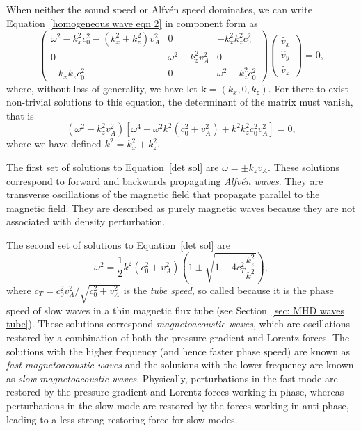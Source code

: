 \documentclass[12pt]{../style-files/ociamthesis}
\begin{document}
When neither the sound speed or Alfv\'{e}n speed dominates, we can write Equation~\eqref{homogeneous wave eqn 2} in component form as
\begin{equation}
	\left(\begin{matrix}
		\omega^2 - k_x^2c_0^2 - (k_x^2 + k_z^2)v_A^2 & 0 & -k_x^2k_z^2c_0^2 \\
		0 & \omega^2 - k_z^2v_A^2 & 0 \\
		-k_xk_zc_0^2 & 0 & \omega^2 - k_z^2c_0^2
	\end{matrix}\right)
	\left(\begin{matrix}
		\hat{v}_x \\
		\hat{v}_y \\
		\hat{v}_z
	\end{matrix} \right) = 0,
\end{equation}
where, without loss of generality, we have let $\mathbf{k} = (k_x, 0, k_z)$. For there to exist non-trivial solutions to this equation, the determinant of the matrix must vanish, that is
\begin{equation}
	(\omega^2 - k_z^2v_A^2)\left[\omega^4 - \omega^2k^2(c_0^2 + v_A^2) + k^2k_z^2c_0^2v_A^2 \right] = 0, \label{det sol}
\end{equation}
where we have defined $k^2 = k_x^2 + k_z^2$.

The first set of solutions to Equation~\eqref{det sol} are $\omega = \pm k_zv_A$. These solutions correspond to forward and backwards propagating \textit{Alfv\'{e}n waves}. They are transverse oscillations of the magnetic field that propagate parallel to the magnetic field. They are described as purely magnetic waves because they are not associated with density perturbation.

The second set of solutions to Equation~\eqref{det sol} are
\begin{equation}
	\omega^2 = \frac{1}{2}k^2(c_0^2 + v_A^2)\left(1 \pm \sqrt{1 - 4c_T^2\frac{k_z^2}{k^2}}\right),
\end{equation}
where $c_T = c_0^2v_A^2/\sqrt{c_0^2 + v_A^2}$ is the \textit{tube speed}, so called because it is the phase speed of slow waves in a thin magnetic flux tube (see Section~\ref{sec: MHD waves tube}). These solutions correspond \textit{magnetoacoustic waves}, which are oscillations restored by a combination of both the pressure gradient and Lorentz forces. The solutions with the higher frequency (and hence faster phase speed) are known as \textit{fast magnetoacoustic waves} and the solutions with the lower frequency are known as \textit{slow magnetoacoustic waves}. Physically, perturbations in the fast mode are restored by the pressure gradient and Lorentz forces working in phase, whereas perturbations in the slow mode are restored by the forces working in anti-phase, leading to a less strong restoring force for slow modes.
\end{document}
